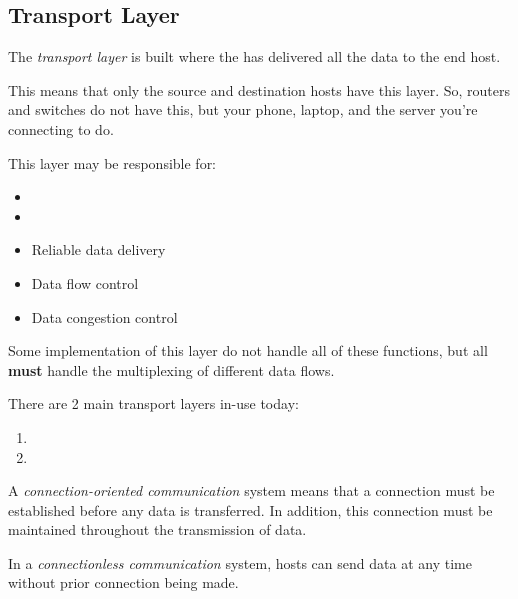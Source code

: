 \subsection{Transport Layer}\label{subsec:Transport_Layer}
\begin{definition}\label{def:Transport_Layer}
  The \emph{transport layer} is built where the  has delivered all the data to the end host.

  This means that only the source and destination hosts have this layer.
  So, routers and switches do not have this, but your phone, laptop, and the server you're connecting to do.

  This layer may be responsible for:
  \begin{itemize}[noitemsep]
  \item {}
  \item {}
  \item Reliable data delivery
  \item Data flow control
  \item Data congestion control
  \end{itemize}
  Some implementation of this layer do not handle all of these functions, but all \textbf{must} handle the multiplexing of different data flows.

  There are 2 main transport layers in-use today:
  \begin{enumerate}[noitemsep]
  \item {}
  \item {}
  \end{enumerate}
\end{definition}

\begin{definition}\label{def:Connection_Oriented_Communication}
  A \emph{connection-oriented communication} system means that a connection must be established before any data is transferred.
  In addition, this connection must be maintained throughout the transmission of data.

  \begin{remark}\label{rmk:Connectionless_Communication}
    In a \emph{connectionless communication} system, hosts can send data at any time without prior connection being made.
  \end{remark}
\end{definition}

